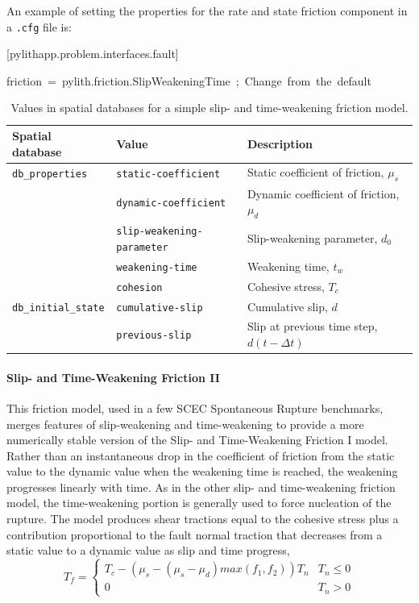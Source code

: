 An example of setting the properties for the rate and state friction
component in a \texttt{.cfg} file is:
\begin{lyxcode}
{[}pylithapp.problem.interfaces.fault{]}

friction~=~pylith.friction.SlipWeakeningTime~;~Change~from~the~default


\end{lyxcode}
\noindent \begin{center}
\begin{table}[H]
\noindent \centering{}\caption{\label{tab:slip:time:weakening:properties:statevars}Values in spatial
databases for a simple slip- and time-weakening friction model.}
\medskip{}
\begin{tabular}{|l|l|>{\raggedright}p{2.5in}|}
\hline 
\textbf{Spatial database} & \textbf{Value} & \textbf{Description}\tabularnewline
\hline 
\hline 
\texttt{db\_properties} & \texttt{static-coefficient} & Static coefficient of friction, $\mu_{s}$\tabularnewline
\cline{2-3} 
 & \texttt{dynamic-coefficient} & Dynamic coefficient of friction, $\mu_{d}$\tabularnewline
\cline{2-3} 
 & \texttt{slip-weakening-parameter} & Slip-weakening parameter, $d_{0}$\tabularnewline
\cline{2-3} 
 & \texttt{weakening-time} & Weakening time, $t_{w}$\tabularnewline
\cline{2-3} 
 & \texttt{cohesion} & Cohesive stress, $T_{c}$\tabularnewline
\hline 
\texttt{db\_initial\_state} & \texttt{cumulative-slip} & Cumulative slip, $d$\tabularnewline
\cline{2-3} 
 & \texttt{previous-slip} & Slip at previous time step, $d(t-\Delta t)$\tabularnewline
\hline 
\end{tabular}
\end{table}

\par\end{center}


\paragraph{\label{sec:friction:slip:time:stable:weakening}Slip- and Time-Weakening
Friction II}

This friction model, used in a few SCEC Spontaneous Rupture benchmarks,
merges features of slip-weakening and time-weakening to provide a
more numerically stable version of the Slip- and Time-Weakening Friction
I model. Rather than an instantaneous drop in the coefficient of friction
from the static value to the dynamic value when the weakening time
is reached, the weakening progresses linearly with time. As in the
other slip- and time-weakening friction model, the time-weakening
portion is generally used to force nucleation of the rupture. The
model produces shear tractions equal to the cohesive stress plus a
contribution proportional to the fault normal traction that decreases
from a static value to a dynamic value as slip and time progress,
\begin{equation}
T_{f}=\begin{cases}
T_{c}-(\mu_{s}-(\mu_{s}-\mu_{d})max(f_{1},f_{2}))T_{n} & T_{n}\leq0\\
0 & T_{n}>0
\end{cases}
\end{equation}


